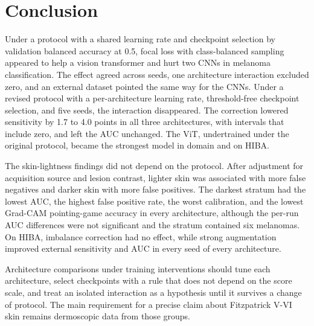 \section{Conclusion}

Under a protocol with a shared learning rate and checkpoint selection by validation balanced accuracy at 0.5, focal loss with class-balanced sampling appeared to help a vision transformer and hurt two CNNs in melanoma classification. The effect agreed across seeds, one architecture interaction excluded zero, and an external dataset pointed the same way for the CNNs. Under a revised protocol with a per-architecture learning rate, threshold-free checkpoint selection, and five seeds, the interaction disappeared. The correction lowered sensitivity by 1.7 to 4.0 points in all three architectures, with intervals that include zero, and left the AUC unchanged. The ViT, undertrained under the original protocol, became the strongest model in domain and on HIBA.

The skin-lightness findings did not depend on the protocol. After adjustment for acquisition source and lesion contrast, lighter skin was associated with more false negatives and darker skin with more false positives. The darkest stratum had the lowest AUC, the highest false positive rate, the worst calibration, and the lowest Grad-CAM pointing-game accuracy in every architecture, although the per-run AUC differences were not significant and the stratum contained six melanomas. On HIBA, imbalance correction had no effect, while strong augmentation improved external sensitivity and AUC in every seed of every architecture.

Architecture comparisons under training interventions should tune each architecture, select checkpoints with a rule that does not depend on the score scale, and treat an isolated interaction as a hypothesis until it survives a change of protocol. The main requirement for a precise claim about Fitzpatrick V-VI skin remains dermoscopic data from those groups.
